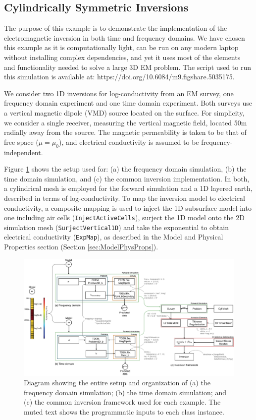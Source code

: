 \subsection{Cylindrically Symmetric Inversions}
\label{sec:CylindricallySymmetricInversions}

The purpose of this example is to demonstrate the implementation of the
electromagnetic inversion in both time and frequency domains. We have chosen
this example as it is computationally light, can be run on any modern
laptop without installing complex dependencies, and yet it uses most of the
elements and functionality needed to solve a large 3D EM problem. The script used to
run this simulation is available at: https://doi.org/10.6084/m9.figshare.5035175.

We consider two 1D inversions for log-conductivity from an EM survey, one
frequency domain experiment and one time domain experiment. Both surveys use a
vertical magnetic dipole (VMD) source located on the surface. For simplicity,
we consider a single receiver, measuring the vertical magnetic field, located 50m
radially away from the source. The magnetic permeability is taken to be that of free space ($\mu = \mu_0$), and electrical conductivity is assumed to be frequency-independent.

Figure \ref{fig:example1structure} shows the setup used for: (a) the frequency
domain simulation, (b) the time domain simulation, and (c) the common
inversion implementation. In both, a cylindrical mesh is employed for the
forward simulation and a 1D layered earth, described in terms of
log-conductivity. To map the inversion model to electrical
conductivity, a composite mapping is used to inject the 1D subsurface model
into one including air cells (\texttt{InjectActiveCells}), surject the 1D
model onto the 2D simulation mesh (\texttt{SurjectVertical1D}) and take the
exponential to obtain electrical conductivity (\texttt{ExpMap}), as described
in the Model and Physical Properties section (Section \ref{sec:ModelPhysProps}).

{%
\begin{figure}[htb!]
    \centering
    \includegraphics[width=\textwidth]{images/simpegEMexamples-03.png}
\caption{Diagram showing the entire setup and organization of (a) the frequency domain simulation; (b) the time domain simulation; and (c) the common inversion framework used for each example. The muted text shows the programmatic inputs to each class instance.}
 \label{fig:example1structure}
\end{figure}
}

